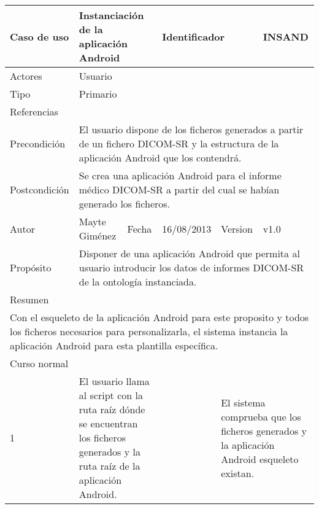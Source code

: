 \begin{center}
  \begin{longtable}{ |b{2.5cm}|b{4cm}|b{1cm}|b{2cm}|b{1.5cm}| b{2.5cm}| }
    \hline
    \cellcolor{RubineRed} {\color{White} Caso de uso} & \multicolumn{2}{|l|}{\parbox{4.5cm}{Instanciación de la aplicación Android}}  & \multicolumn{2}{|l|}{\color{RubineRed} Identificador}  &  INSAND \\ 
    \hline \hline
    {\color{RubineRed} Actores } & \multicolumn{5}{|l|}{Usuario}  \\ 
    \hline
    {\color{RubineRed} Tipo } & \multicolumn{5}{|l|}{Primario}  \\ 
    \hline
    {\color{RubineRed} Referencias } & \multicolumn{5}{|l|}{}  \\ 
    \hline
    {\color{RubineRed} Precondición } & \multicolumn{5}{|l|}{\parbox{13cm}{El usuario dispone de los ficheros generados a partir de un fichero DICOM-SR y la estructura de la aplicación Android que los contendrá.} }  \\ 
    \hline
    {\color{RubineRed} Postcondición } & \multicolumn{5}{|l|}{\parbox{13cm}{Se crea una aplicación Android para el informe médico DICOM-SR a partir del cual se habían generado los ficheros.}}  \\ 
    \hline
    {\color{RubineRed} Autor } &  Mayte Giménez & {\color{RubineRed} Fecha } & 16/08/2013 & {\color{RubineRed} Version } & v1.0 \\ 
    \hline
    {\color{RubineRed} Propósito } & \multicolumn{5}{|l|}{\parbox{13cm}{Disponer de una aplicación Android que permita al usuario introducir los datos de informes DICOM-SR de la ontología instanciada.}}  \\ 
    \hline
    \multicolumn{6}{|l|}{\parbox{8cm}{{\color{RubineRed} Resumen }}}  \\ 
    \hline
   	\multicolumn{6}{|l|}{\parbox{8cm}{ Con el esqueleto de la aplicación Android para este proposito y todos los ficheros necesarios para personalizarla, el sistema instancia la aplicación Android para esta plantilla específica.}}  \\ 
    \hline
    \multicolumn{6}{|l|}{\parbox{8cm}{{\color{RubineRed} Curso normal }}}  \\ 
    \hline
    1 & \multicolumn{2}{|l|}{\parbox{5cm}{El usuario llama al script con la ruta raíz dónde se encuentran los ficheros generados y la ruta raíz de la aplicación Android.}} &  & \multicolumn{2}{|l|}{\parbox{5cm}{ El sistema comprueba que los ficheros generados y la aplicación Android esqueleto existan.}}\\

\end{longtable}
\end{center}
